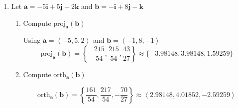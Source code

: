 \documentclass[12pt]{exam}
\newcommand{\gen}[1]{\left\langle #1 \right\rangle}
\newcommand{\ba}{\bm{a}}
\newcommand{\bb}{\bm{b}}
\begin{document}
\begin{enumerate}
    \item Let \(\ba=-5\bm{i}+5\bm{j}+2\bm{k}\) and \(\bb=-\bm{i}+8\bm{j}-\bm{k}\)
    \begin{enumerate}
        \item Compute \(\mathrm{proj_{\ba}(\bb)}\) 
          \begin{solution}
              Using \(\ba=\gen{-5,5,2}\) and \(\bb=\gen{-1,8,-1}\)
              \[
              \mathrm{proj_{\ba}(\bb)}=\left\{-\frac{215}{54},\frac{215}{54},\frac{43}{27}\right\}\approx \{-3.98148,3.98148,1.59259\}
              \]
          \end{solution}
        \item Compute \(\mathrm{orth_{\ba}(\bb)}\)
        \begin{solution}
              \[
                \mathrm{orth_{\ba}(\bb)}=\left\{\frac{161}{54},\frac{217}{54},-\frac{70}{27}\right\}\approx \gen{2.98148, 4.01852, -2.59259}
              \]
              \end{solution}
    \end{enumerate}
\end{enumerate}





\end{document}
